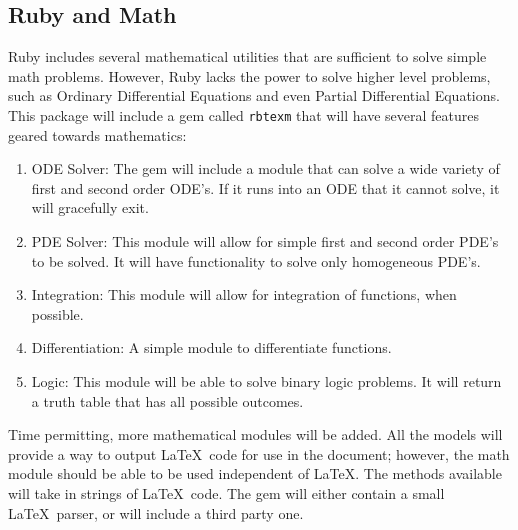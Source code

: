 \documentclass{article}
\newcommand{\inlinecode}[1]{\texttt{#1}}
\begin{document}
\subsection{Ruby and Math}
Ruby includes several mathematical utilities that are sufficient to solve simple math problems.
However, Ruby lacks the power to solve higher level problems, such as Ordinary Differential
Equations and even Partial Differential Equations. This package will include a gem called
\inlinecode{rbtexm} that will have several features geared towards mathematics:
\begin{enumerate}
\item ODE Solver: The gem will include a module that can solve a wide variety of first and second
order ODE's. If it runs into an ODE that it cannot solve, it will gracefully exit.
\item PDE Solver: This module will allow for simple first and second order PDE's to be solved. It
will have functionality to solve only homogeneous PDE's.
\item Integration: This module will allow for integration of functions, when possible.
\item Differentiation: A simple module to differentiate functions.
\item Logic: This module will be able to solve binary logic problems. It will return a truth table
that has all possible outcomes.
\end{enumerate}

Time permitting, more mathematical modules will be added. All the models will provide a way to
output \LaTeX\ code for use in the document; however, the math module should be able to be used
independent of \LaTeX. The methods available will take in strings of \LaTeX\ code. The gem will
either contain a small \LaTeX\ parser, or will include a third party one.
\end{document}
